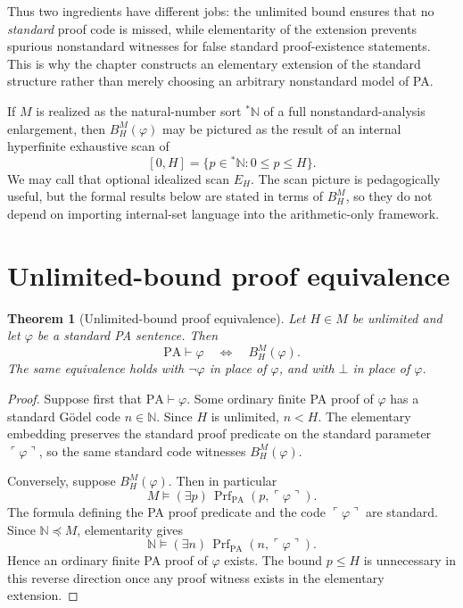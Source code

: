 \documentclass[11pt,openany]{book}
\newtheorem{theorem}{Theorem}[chapter]
\theoremstyle{definition}
\theoremstyle{remark}
\newcommand{\N}{\mathbb{N}}
\newcommand{\Prf}{\operatorname{Prf}}
\begin{document}
Thus two ingredients have different jobs: the unlimited bound ensures that no \emph{standard} proof code is missed, while elementarity of the extension prevents spurious nonstandard witnesses for false standard proof-existence statements. This is why the chapter constructs an elementary extension of the standard structure rather than merely choosing an arbitrary nonstandard model of PA.

If \(M\) is realized as the natural-number sort \({}^*\N\) of a full nonstandard-analysis enlargement, then \(B_H^M(\varphi)\) may be pictured as the result of an internal hyperfinite exhaustive scan of
\[
[0,H]=\{p\in{}^*\N:0\le p\le H\}.
\]
We may call that optional idealized scan \(E_H\). The scan picture is pedagogically useful, but the formal results below are stated in terms of \(B_H^M\), so they do not depend on importing internal-set language into the arithmetic-only framework.

\section{Unlimited-bound proof equivalence}
\begin{theorem}[Unlimited-bound proof equivalence]\label{thm:hyperproofequiv}
Let \(H\in M\) be unlimited and let \(\varphi\) be a standard PA sentence. Then
\[
\mathrm{PA}\vdash\varphi
\quad\Longleftrightarrow\quad
B_H^M(\varphi).
\]
The same equivalence holds with \(\neg\varphi\) in place of \(\varphi\), and with \(\bot\) in place of \(\varphi\).
\end{theorem}
\begin{proof}
Suppose first that \(\mathrm{PA}\vdash\varphi\). Some ordinary finite PA proof of \(\varphi\) has a standard G\"odel code \(n\in\N\). Since \(H\) is unlimited, \(n<H\). The elementary embedding preserves the standard proof predicate on the standard parameter \(\ulcorner\varphi\urcorner\), so the same standard code witnesses \(B_H^M(\varphi)\).

Conversely, suppose \(B_H^M(\varphi)\). Then in particular
\[
M\models(\exists p)\,\Prf_{\mathrm{PA}}(p,\ulcorner\varphi\urcorner).
\]
The formula defining the PA proof predicate and the code \(\ulcorner\varphi\urcorner\) are standard. Since \(\N\preccurlyeq M\), elementarity gives
\[
\N\models(\exists n)\,\Prf_{\mathrm{PA}}(n,\ulcorner\varphi\urcorner).
\]
Hence an ordinary finite PA proof of \(\varphi\) exists. The bound \(p\le H\) is unnecessary in this reverse direction once any proof witness exists in the elementary extension.
\end{proof}
\end{document}
